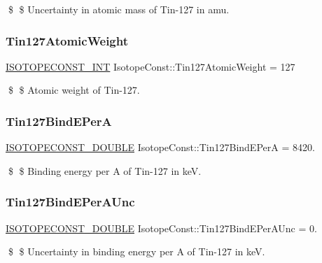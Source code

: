 \$ \$ Uncertainty in atomic mass of Tin-\/127 in amu. \mbox{\label{group___isotope_const-_tin-_sn127_gaec65ac4d6ffe000b185ed8d26ee21496}} 
\subsubsection{\texorpdfstring{Tin127\+Atomic\+Weight}{Tin127AtomicWeight}}
{\footnotesize\ttfamily \mbox{\hyperlink{group___isotope_const-_macros_ga5f18360b3e99483a35c32d789e62621c}{I\+S\+O\+T\+O\+P\+E\+C\+O\+N\+S\+T\+\_\+\+I\+NT}} Isotope\+Const\+::\+Tin127\+Atomic\+Weight = 127}

\$ \$ Atomic weight of Tin-\/127. \mbox{\label{group___isotope_const-_tin-_sn127_ga43c243bd35ada3eb7e29ceeedccea79a}} 
\subsubsection{\texorpdfstring{Tin127\+Bind\+E\+PerA}{Tin127BindEPerA}}
{\footnotesize\ttfamily \mbox{\hyperlink{group___isotope_const-_macros_ga8f45a7272ce02c0b4c65c44636ed719a}{I\+S\+O\+T\+O\+P\+E\+C\+O\+N\+S\+T\+\_\+\+D\+O\+U\+B\+LE}} Isotope\+Const\+::\+Tin127\+Bind\+E\+PerA = 8420.}

\$ \$ Binding energy per A of Tin-\/127 in keV. \mbox{\label{group___isotope_const-_tin-_sn127_gac90e763386810e8ed3e094e885ed300c}} 
\subsubsection{\texorpdfstring{Tin127\+Bind\+E\+Per\+A\+Unc}{Tin127BindEPerAUnc}}
{\footnotesize\ttfamily \mbox{\hyperlink{group___isotope_const-_macros_ga8f45a7272ce02c0b4c65c44636ed719a}{I\+S\+O\+T\+O\+P\+E\+C\+O\+N\+S\+T\+\_\+\+D\+O\+U\+B\+LE}} Isotope\+Const\+::\+Tin127\+Bind\+E\+Per\+A\+Unc = 0.}

\$ \$ Uncertainty in binding energy per A of Tin-\/127 in keV. \mbox{\label{group___isotope_const-_tin-_sn127_ga203894618ec16a3ec907ee598004c489}} 
